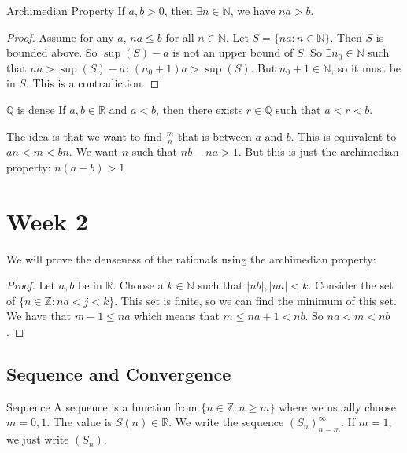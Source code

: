 \documentclass{report}
\begin{document}
\begin{theorem}{Archimedian Property}
    If $a, b > 0$, then $\exists n \in \mathbb{N}$, we have $na > b$.
\end{theorem}
\begin{proof}
    Assume for any $a$, $na \leq b$ for all $n \in \mathbb{N}$. Let $S = \{na : n \in \mathbb{N}\}$. Then $S$ is bounded above. So $\sup (S) - a$ is not an upper bound of $S$. So $\exists n_{0} \in \mathbb{N}$ such that $na > \sup (S) - a$: $(n_{0} + 1)a >  \sup (S)$. But $n_{0} + 1 \in \mathbb{N}$, so it must be in $S$. This is a contradiction.
\end{proof}

\begin{theorem}{$\mathbb{Q}$ is dense}
    If $a, b \in \mathbb{R}$ and $a < b$, then there exists $r \in \mathbb{Q}$ such that $a < r < b$.
\end{theorem}

The idea is that we want to find $\frac{m}{n}$ that is between $a$ and $b$. This is equivalent to $an < m < bn$. We want $n$ such that $nb - na >  1$. But this is just the archimedian property: $n(a - b) > 1$

\chapter{Week 2}

We will prove the denseness of the rationals using the archimedian property:
    \begin{proof}
        Let $a, b$ be in $\mathbb{R}$. Choose a $k \in \mathbb{N}$ such that $\lvert nb \rvert, \lvert na \rvert <  k$. Consider the set of $\{n \in \mathbb{Z} : na <  j < k\}$. This set is finite, so we can find the minimum of this set. We have that $m - 1 \leq na$ which means that $m \leq na + 1 < nb$. So $na < m < nb$.
    \end{proof}

\begin{topic}
    \section{Sequence and Convergence}
\end{topic}

\begin{definition}{Sequence}
    A sequence is a function from $\{n \in \mathbb{Z}: n \geq m\}$ where we usually choose $m = 0, 1$. The value is $S(n) \in \mathbb{R}$. We write the sequence  $(S_{n})_{n = m}^{\infty}$. If $m = 1$, we just write $(S_{n})$.
\end{definition}
\end{document}
